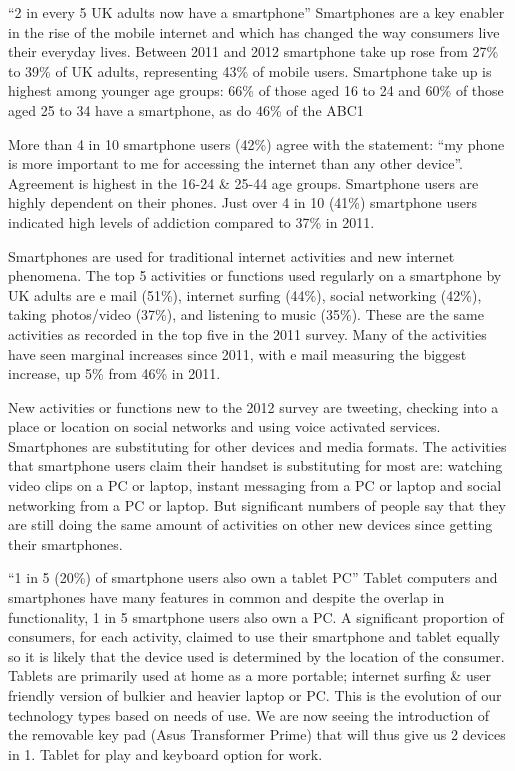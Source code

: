 \documentclass[letterpaper,10pt,openany,oneside,english]{sphinxmanual}
\begin{document}

“2 in every 5 UK adults now have a smartphone” Smartphones are a key enabler in the rise of the mobile internet and which has changed the way consumers live their everyday lives. Between 2011 and 2012 smartphone take up rose from 27\% to 39\% of UK adults, representing 43\% of mobile users. Smartphone take up is highest among younger age groups: 66\% of those aged 16 to 24 and 60\% of those aged 25 to 34 have a smartphone, as do 46\% of the ABC1

More than 4 in 10 smartphone users (42\%) agree with the statement: “my phone is more important to me for accessing the internet than any other device”. Agreement is highest in the 16-24 \& 25-44 age groups. Smartphone users are highly dependent on their phones. Just over 4 in 10 (41\%) smartphone users indicated high levels of addiction compared to 37\% in 2011.

Smartphones are used for traditional internet activities and new internet phenomena. The top 5 activities or functions used regularly on a smartphone by UK adults are e mail (51\%), internet surfing (44\%), social networking (42\%), taking photos/video (37\%), and listening to music (35\%). These are the same activities as recorded in the top five in the 2011 survey. Many of the activities have seen marginal increases since 2011, with e mail measuring the biggest increase, up 5\% from 46\% in 2011.

New activities or functions new to the 2012 survey are tweeting, checking into a place or location on social networks and using voice activated services. Smartphones are substituting for other devices and media formats. The activities that smartphone users claim their handset is substituting for most are: watching video clips on a PC or laptop, instant messaging from a PC or laptop and social networking from a PC or laptop. But significant numbers of people say that they are still doing the same amount of activities on other new devices since getting their smartphones.

“1 in 5 (20\%) of smartphone users also own a tablet PC” Tablet computers and smartphones have many features in common and despite the overlap in functionality, 1 in 5 smartphone users also own a PC. A significant proportion of consumers, for each activity, claimed to use their smartphone and tablet equally so it is likely that the device used is determined by the location of the consumer. Tablets are primarily used at home as a more portable; internet surfing \& user friendly version of bulkier and heavier laptop or PC. This is the evolution of our technology types based on needs of use. We are now seeing the introduction of the removable key pad (Asus Transformer Prime) that will thus give us 2 devices in 1. Tablet for play and keyboard option for work.
\end{document}
